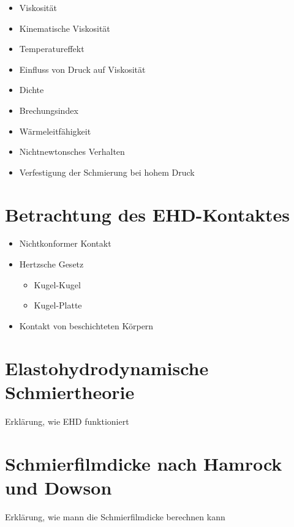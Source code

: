 \begin{itemize}
    \item Viskosität
    \item Kinematische Viskosität
    \item Temperatureffekt
    \item Einfluss von Druck auf Viskosität
    \item Dichte
    \item Brechungsindex
    \item Wärmeleitfähigkeit
    \item Nichtnewtonsches Verhalten
    \item Verfestigung der Schmierung bei hohem Druck
\end{itemize}

\section{Betrachtung des EHD-Kontaktes}
\label{sec:betrachtung_des_ehd_kontaktes}

\begin{itemize}
    \item Nichtkonformer Kontakt
    \item Hertzsche Gesetz
        \begin{itemize}
            \item Kugel-Kugel
            \item Kugel-Platte
        \end{itemize}
    \item Kontakt von beschichteten Körpern
\end{itemize}

\section{Elastohydrodynamische Schmiertheorie}
\label{elastohydrodynamische_schmiertheorie}

Erklärung, wie EHD funktioniert

\section{Schmierfilmdicke nach Hamrock und Dowson}
\label{sec:schmierfilmdicke_nach_hamrock_und_dowson}
Erklärung, wie mann die Schmierfilmdicke berechnen kann

